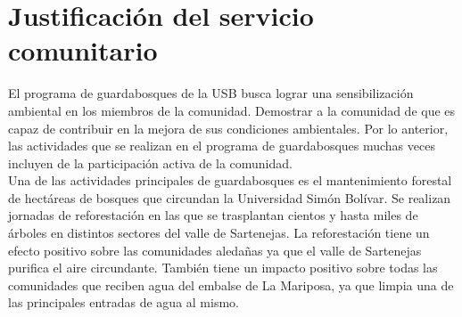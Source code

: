 \chapter*{Justificación del servicio comunitario}

El programa de guardabosques de la USB busca lograr una sensibilización ambiental en los miembros de la comunidad. Demostrar a la comunidad de que es capaz de contribuir en la mejora de sus condiciones ambientales. Por lo anterior, las actividades que se realizan en el programa de guardabosques muchas veces incluyen de la participación activa de la comunidad.
\\

Una de las actividades principales de guardabosques es el mantenimiento forestal de hectáreas de bosques que circundan la Universidad Simón Bolívar. Se realizan jornadas de reforestación en las que se trasplantan cientos y hasta miles de árboles en distintos sectores del valle de Sartenejas. La reforestación tiene un efecto positivo sobre las comunidades aledañas ya que el valle de Sartenejas purifica el aire circundante. También tiene un impacto positivo sobre todas las comunidades que reciben agua del embalse de La Mariposa, ya que limpia una de las principales entradas de agua al mismo.